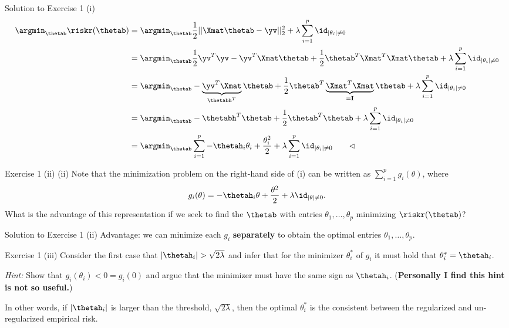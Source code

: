 \documentclass[aspectratio=169]{beamer}
\newcommand{\thetahi}{\thetah_i}
\newcommand{\thetai}{\theta_i}
\newcommand{\thetainnz}{\id_{|\theta_i| \neq 0}}
\newcommand{\Imat}{\mathbf{I}}
\newcommand{\sumip}{\sum_{i=1}^p}
\begin{document}
\begin{frame}{Solution to Exercise 1 (i)}
	\begin{align*}
		\argmin_{\thetab} \riskr(\thetab) &= \argmin_{\thetab} \frac{1}{2} ||\Xmat\thetab - \yv||_2^2  + \lambda \sumip \thetainnz \\
		&= \argmin_{\thetab} \frac{1}{2} \yv^T \yv - \yv^T \Xmat \thetab + \frac{1}{2} \thetab^T \Xmat^T \Xmat \thetab + \lambda \sumip \thetainnz \\
		&= \argmin_{\thetab} - \underbrace{\yv^T \Xmat}_{\thetabh^T} \thetab + \frac{1}{2} \thetab^T \underbrace{\Xmat^T \Xmat}_{= \Imat} \thetab + \lambda \sumip \thetainnz \\
		&= \argmin_{\thetab} - \thetabh^T \thetab + \frac{1}{2} \thetab^T \thetab + \lambda \sumip \thetainnz \\
		&= \argmin_{\thetab} \sumip - \thetahi \thetai + \frac{\thetai^2}{2} + \lambda \sumip \thetainnz  \qquad \lhd \\ 
	\end{align*}
\end{frame}

\begin{frame}{Exercise 1 (ii)}
	(ii) Note that the minimization problem on the right-hand side of (i) can be written as $\sumip g_i(\theta)$, where 
		$$g_i(\theta) = -\thetahi \theta + \frac{\theta^2}{2} + \lambda \id_{|\theta| \neq 0}.$$
		What is the advantage of this representation if we seek to find the $\thetab$ with entries $\theta_1, \ldots, \theta_p$ minimizing $\riskr(\thetab)$?
\end{frame}


\begin{frame}{Solution to Exercise 1 (ii)}
	Advantage: we can minimize each $g_i$ \textbf{separately} to obtain the optimal entries $\theta_1, \ldots, \theta_p$.
\end{frame}

\begin{frame}{Exercise 1 (iii)}
	Consider the first case that $|\thetahi| > \sqrt{2 \lambda}$ and infer that for the minimizer $\thetai^*$ of $g_i$ it must hold that $\thetai^* = \thetahi$. 
	
	\emph{Hint:} Show that $g_i(\thetai) < 0 = g_i(0)$ and argue that the minimizer must have the same sign as $\thetahi$. (\textbf{Personally I find this hint is not so useful.})
	
	In other words, if $|\thetahi|$ is larger than the threshold, $\sqrt{2 \lambda}$, then the optimal $\theta^*_i$ is the consistent between the regularized and un-regularized empirical risk.
\end{frame}
\end{document}
